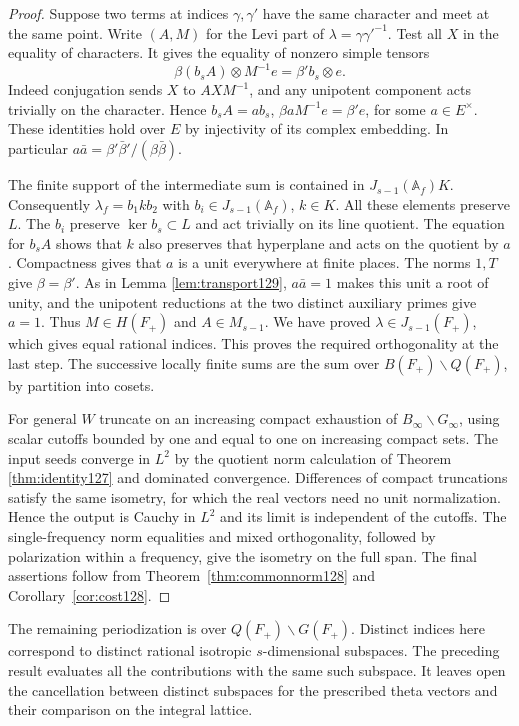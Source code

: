 \documentclass[a4paper,11pt]{article}
\theoremstyle{definition}
\theoremstyle{remark}
\numberwithin{equation}{section}
\begin{document}
\begin{proof}
Suppose two terms at indices \(\gamma,\gamma'\) have the same
character and meet at the same point. Write \((A,M)\) for the
Levi part of \(\lambda=\gamma\gamma'^{-1}\).
Test all \(X\) in the equality of characters. It gives the equality
of nonzero simple tensors
\[
       \beta(b_s A)\otimes M^{-1}e=\beta' b_s\otimes e .
\]
Indeed conjugation sends \(X\) to \(AXM^{-1}\), and any
unipotent component acts trivially on the character. Hence
\(b_s A=a b_s\), \(\beta a M^{-1}e=\beta'e\), for some
\(a\in E^\times\). These identities hold over \(E\) by injectivity
of its complex embedding. In particular
\(a\bar a=\beta'\bar\beta'/(\beta\bar\beta)\).

The finite support of the intermediate sum is contained in
\(J_{s-1}(\mathbb A_f)K\). Consequently
\(\lambda_f=b_1 k b_2\) with \(b_i\in J_{s-1}(\mathbb A_f)\),
\(k\in K\). All these elements preserve \(L\). The \(b_i\)
preserve \(\ker b_s\subset L\) and act trivially on its line
quotient. The equation for \(b_s A\) shows that \(k\) also
preserves that hyperplane and acts on the quotient by \(a\).
Compactness gives that \(a\) is a unit everywhere at finite
places. The norms \(1,T\) give \(\beta=\beta'\). As in Lemma \ref{lem:transport129}, \(a\bar a=1\) makes this unit a root of unity,
and the unipotent reductions at the two distinct auxiliary
primes give \(a=1\). Thus \(M\in H(F_+)\) and \(A\in M_{s-1}\).
We have proved \(\lambda\in J_{s-1}(F_+)\), which gives equal
rational indices. This proves the required orthogonality at the
last step. The successive locally finite sums are the sum over
\(B(F_+)\backslash Q(F_+)\), by partition into cosets.

For general \(W\) truncate on an increasing compact exhaustion
of \(B_\infty\backslash G_\infty\), using scalar cutoffs bounded
by one and equal to one on increasing compact sets. The input
seeds converge in \(L^2\) by the quotient norm calculation of
Theorem \ref{thm:identity127} and dominated convergence. Differences
of compact truncations satisfy the same isometry, for which
the real vectors need no unit normalization. Hence the output
is Cauchy in \(L^2\) and its limit is independent of the cutoffs.
The single-frequency norm equalities and mixed orthogonality,
followed by polarization within a frequency, give the isometry
on the full span. The final assertions follow from
Theorem~\ref{thm:commonnorm128} and Corollary~\ref{cor:cost128}.
\end{proof}

The remaining periodization is over \(Q(F_+)\backslash G(F_+)\).
Distinct indices here correspond to distinct rational isotropic
\(s\)-dimensional subspaces. The preceding result evaluates all
the contributions with the same such subspace. It leaves open
the cancellation between distinct subspaces for the prescribed
theta vectors and their comparison on the integral lattice.
\end{document}
